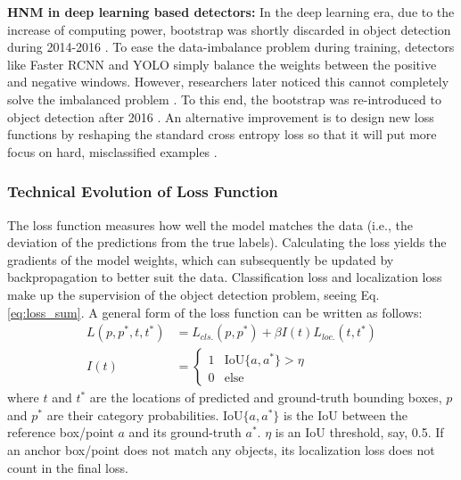 \documentclass[lettersize,journal]{IEEEtran}
\begin{document}
\textbf{HNM in deep learning based detectors:} In the deep learning era, due to the increase of computing power, bootstrap was shortly discarded in object detection during 2014-2016 \cite{CVPR14-RCNN, ECCV14-SPPNet, ICCV15-FastRCNN, NIPS15-FasterRCNN, CVPR16-YOLO}. To ease the data-imbalance problem during training, detectors like Faster RCNN and YOLO simply balance the weights between the positive and negative windows. However, researchers later noticed this cannot completely solve the imbalanced problem \cite{ICCV17-Focal}. To this end, the bootstrap was re-introduced to object detection after 2016 \cite{ECCV16-SSD, ECCV16-FasterPed, CVPR16-OHEM, CVPR18-SingleShotRefine}. An alternative improvement is to design new loss functions \cite{ICCV17-Focal} by reshaping the standard cross entropy loss so that it will put more focus on hard, misclassified examples \cite{ICCV17-Focal}.


\subsubsection{Technical Evolution of Loss Function}\label{subsec:lossfunc}
The loss function measures how well the model matches the data (i.e., the deviation of the predictions from the true labels). Calculating the loss yields the gradients of the model weights, which can subsequently be updated by backpropagation to better suit the data. Classification loss and localization loss make up the supervision of the object detection problem, seeing Eq. \ref{eq:loss_sum}. A general form of the loss function can be written as follows:
\begin{equation}
\begin{split}
L(p, p^*, t, t^*) &= L_{cls.}(p, p^*) + \beta I(t)L_{loc.}(t, t^*) \\
I(t) &=
\begin{cases}
1 & \text{IoU}\{a, a^*\}>\eta \\
0 & \text{else}
\end{cases}
\end{split} \label{eq:loss_sum}
\end{equation}
where $t$ and $t^*$ are the locations of predicted and ground-truth bounding boxes, $p$ and $p^*$ are their category probabilities. $\text{IoU}\{a, a^*\}$ is the IoU between the reference box/point $a$ and its ground-truth $a^*$. $\eta$ is an IoU threshold, say, 0.5. If an anchor box/point does not match any objects, its localization loss does not count in the final loss.
\end{document}
